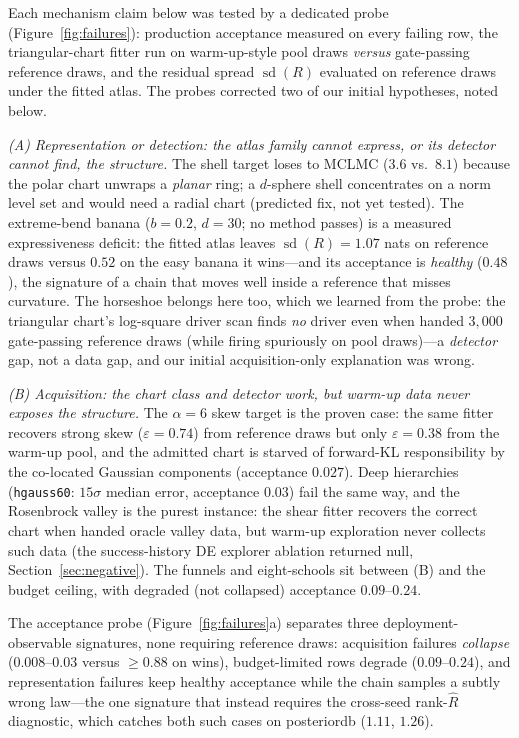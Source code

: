 \documentclass[11pt]{article}
\theoremstyle{remark}
\begin{document}
Each mechanism claim below was tested by a dedicated probe
(Figure~\ref{fig:failures}): production acceptance measured on every
failing row, the triangular-chart fitter run on warm-up-style pool
draws \emph{versus} gate-passing reference draws, and the residual
spread $\operatorname{sd}(R)$ evaluated on reference draws under the
fitted atlas. The probes corrected two of our initial hypotheses,
noted below.

\emph{(A) Representation or detection: the atlas family cannot
express, or its detector cannot find, the structure.} The shell target
loses to MCLMC ($3.6$ vs.\ $8.1$) because the polar chart unwraps a
\emph{planar} ring; a $d$-sphere shell concentrates on a norm level
set and would need a radial chart (predicted fix, not yet tested). The
extreme-bend banana ($b{=}0.2$, $d{=}30$; no method passes) is a
measured expressiveness deficit: the fitted atlas leaves
$\operatorname{sd}(R)=1.07$ nats on reference draws versus $0.52$ on
the easy banana it wins---and its acceptance is \emph{healthy}
($0.48$), the signature of a chain that moves well inside a reference
that misses curvature. The horseshoe belongs here too, which we
learned from the probe: the triangular chart's log-square driver scan
finds \emph{no} driver even when handed $3{,}000$ gate-passing
reference draws (while firing spuriously on pool draws)---a
\emph{detector} gap, not a data gap, and our initial
acquisition-only explanation was wrong.

\emph{(B) Acquisition: the chart class and detector work, but warm-up
data never exposes the structure.} The $\alpha{=}6$ skew target is the
proven case: the same fitter recovers strong skew
($\varepsilon=0.74$) from reference draws but only $\varepsilon=0.38$
from the warm-up pool, and the admitted chart is starved of
forward-KL responsibility by the co-located Gaussian components
(acceptance $0.027$). Deep hierarchies (\texttt{hgauss60}:
$15\sigma$ median error, acceptance $0.03$) fail the same way, and
the Rosenbrock valley is the purest instance: the shear fitter
recovers the correct chart when handed oracle valley data, but
warm-up exploration never collects such data (the success-history DE
explorer ablation returned null, Section~\ref{sec:negative}). The
funnels and eight-schools sit between (B) and the budget ceiling,
with degraded (not collapsed) acceptance $0.09$--$0.24$.

The acceptance probe (Figure~\ref{fig:failures}a) separates three
deployment-observable signatures, none requiring reference draws:
acquisition failures \emph{collapse} ($0.008$--$0.03$ versus
$\ge0.88$ on wins), budget-limited rows degrade ($0.09$--$0.24$), and
representation failures keep healthy acceptance while the chain
samples a subtly wrong law---the one signature that instead requires
the cross-seed rank-$\widehat R$ diagnostic, which catches both such
cases on posteriordb ($1.11$, $1.26$).
\end{document}
